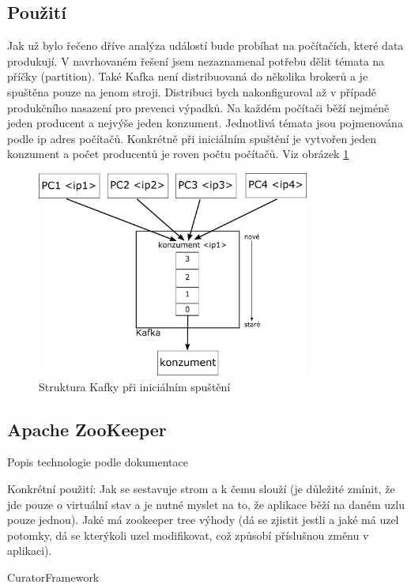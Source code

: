 \documentclass[
  digital, %
  table,   %
  nolof,     %
  nolot,     %
  twoside,
  nocover,
  monochrome,
  12pt
]{fithesis3}
\begin{document}
\subsection*{Použití}
Jak už bylo řečeno dříve analýza událostí bude probíhat na počítačích, které data produkují. V navrhovaném řešení jsem nezaznamenal potřebu dělit témata na příčky (partition). Také Kafka není distribuovaná do několika brokerů a je spuštěna pouze na jenom stroji. Distribuci bych nakonfiguroval až v případě produkčního nasazení pro prevenci výpadků. Na každém počítači běží nejméně jeden producent a nejvýše jeden konzument. Jednotlivá témata jsou pojmenována podle ip adres počítačů. Konkrétně při iniciálním spuštění je vytvořen jeden konzument a počet producentů je roven počtu počítačů. Viz obrázek \ref{fig:kafka-impl}

\begin{figure}[h]
	\centering
    \includegraphics[width=0.8\textwidth, height=0.45\textheight]{images/kafka-impl.png}
    \caption{Struktura Kafky při iniciálním spuštění}
    \label{fig:kafka-impl}
\end{figure}

\subsection{Apache ZooKeeper}
Popis technologie podle dokumentace

Konkrétní použití: Jak se sestavuje strom a k čemu slouží (je důležité zmínit, že jde pouze o virtuální stav a je nutné myslet na to, že aplikace běží na daném uzlu pouze jednou). Jaké má zookeeper tree výhody (dá se zjistit jestli a jaké má uzel potomky, dá se kterýkoli uzel modifikovat, což způsobí příslušnou změnu v aplikaci).

CuratorFramework
\end{document}
